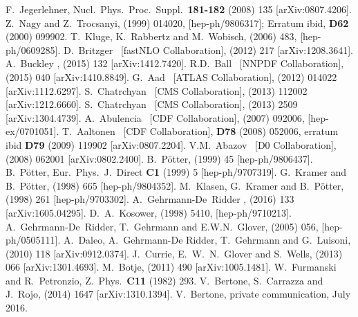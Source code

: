 \documentclass[12pt]{article}
\begin{document}
\begin{flushleft}
\begin{thebibliography}{99}
  F.~Jegerlehner, Nucl.~Phys.~Proc.~Suppl.~{\bf 181-182} (2008) 135 [arXiv:0807.4206].
%
 Z.~Nagy and Z.~Trocsanyi,  (1999) 014020, [hep-ph/9806317]; Erratum ibid, {\bf D62} (2000) 099902.
%
 T.~Kluge, K.~Rabbertz and M.~Wobisch,  (2006) 483, [hep-ph/0609285].
 D.~Britzger \etal\ [fastNLO Collaboration],  (2012) 217 [arXiv:1208.3641].
%
 A.~Buckley \etal,  (2015) 132 [arXiv:1412.7420].
 R.D.~Ball \etal\ [NNPDF Collaboration],  (2015) 040 [arXiv:1410.8849].
%
%
%
 G.~Aad \etal\ [ATLAS Collaboration],  (2012) 014022 [arXiv:1112.6297].
 S.~Chatrchyan \etal\ [CMS Collaboration],  (2013) 112002 [arXiv:1212.6660].
 S.~Chatrchyan \etal\ [CMS Collaboration],  (2013) 2509 [arXiv:1304.4739].
  A.~Abulencia \etal\ [CDF Collaboration],  (2007) 092006, [hep-ex/0701051].
  T.~Aaltonen \etal\ [CDF Collaboration], \PRD
  {\bf D78} (2008) 052006, erratum ibid {\bf D79} (2009) 119902
  [arXiv:0807.2204].
 V.M.~Abazov \etal\ [D0 Collaboration],  (2008) 062001 [arXiv:0802.2400].
%
 B.~P\"otter,  (1999) 45 [hep-ph/9806437].
 B.~P\"otter, Eur.~Phys.~J.~Direct {\bf C1} (1999) 5 [hep-ph/9707319].
 G.~Kramer and B.~P\"otter,  (1998) 665 [hep-ph/9804352].
 M.~Klasen, G.~Kramer and B.~P\"otter,  (1998) 261 [hep-ph/9703302].
%
 A.~Gehrmann-De~Ridder \etal,  (2016) 133 [arXiv:1605.04295].
  D.~A.~Kosower,  (1998) 5410, [hep-ph/9710213].
 A.~Gehrmann-De~Ridder, T.~Gehrmann and E.W.N.~Glover,  (2005) 056, [hep-ph/0505111].
 A.~Daleo, A.~Gehrmann-De Ridder, T.~Gehrmann and G.~Luisoni,  (2010) 118 [arXiv:0912.0374].
 J.~Currie, E.~W.~N.~Glover and S.~Wells,  (2013) 066 [arXiv:1301.4693].
%
 M.~Botje,  (2011)  490 [arXiv:1005.1481].
  W.~Furmanski and R.~Petronzio, Z.~Phys.~{\bf C11} (1982) 293.
%
 V.~Bertone, S.~Carrazza and  J.~Rojo,  (2014) 1647 [arXiv:1310.1394].
  V.~Bertone, private communication, July 2016.

\end{thebibliography}
\end{flushleft}
\end{document}
